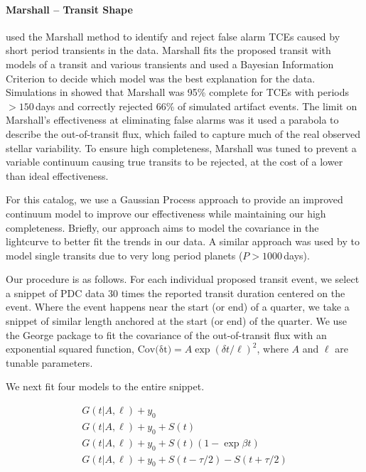 \paragraph{Marshall -- Transit Shape}
\label{marshsec}
\citet{Coughlin2016} used the Marshall method \citep{Mullally16} to identify and reject false alarm TCEs caused by short period transients in the data. Marshall fits the proposed transit with models of a transit and various transients and used a Bayesian Information Criterion to decide which model was the best explanation for the data. Simulations in \citet{Mullally16} showed that Marshall was 95\% complete for TCEs with periods $>150$\,days and correctly rejected 66\% of simulated artifact events. The limit on Marshall's effectiveness at eliminating false alarms was it used a parabola to describe the out-of-transit flux, which failed to capture much of the real observed stellar variability. To ensure high completeness, Marshall was tuned to prevent a variable continuum causing true transits to be rejected, at the cost of a lower than ideal effectiveness.

For this catalog, we use a Gaussian Process approach \citep[GP][]{Rasmussen10} to provide an improved continuum model to improve our effectiveness while maintaining our high completeness. Briefly, our approach aims to model the covariance in the lightcurve to better fit the trends in our data.
A similar approach was used by \citet{ForemanMackey16} to model single transits due to very long period planets ($P > 1000$\,days).

Our procedure is as follows. For each individual proposed transit event, we select a snippet of PDC data 30 times the reported transit duration centered on the event. Where the event happens near the start (or end) of a quarter, we take a snippet of similar length anchored at the start (or end) of the quarter. We use the George package \citep{Ambikasaran14} to fit the covariance of the out-of-transit flux with an exponential squared function, $ {\mathrm{Cov(\delta t})} = A \exp{ (\delta t/\ell)^2}$, where $A$ and $\ell$ are tunable parameters. 

We next fit four models to the entire snippet.

\begin{equation}
\left.\begin{aligned}
G(t | A, \ell) + y_0 \\
G(t | A, \ell) + y_0 + S(t)\\
G(t | A, \ell) + y_0 + S(t)(1 - \exp{\beta t})\\
G(t | A, \ell) + y_0 + S(t - \tau/2) - S(t + \tau/2) 
\end{aligned}\right.
\end{equation}


